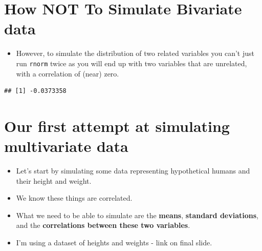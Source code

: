 \documentclass[
]{article}
\newenvironment{Shaded}{\begin{snugshade}}{\end{snugshade}}
\newcommand{\AttributeTok}[1]{\textcolor[rgb]{0.13,0.29,0.53}{#1}}
\newcommand{\CommentTok}[1]{\textcolor[rgb]{0.56,0.35,0.01}{\textit{#1}}}
\newcommand{\DecValTok}[1]{\textcolor[rgb]{0.00,0.00,0.81}{#1}}
\newcommand{\FunctionTok}[1]{\textcolor[rgb]{0.13,0.29,0.53}{\textbf{#1}}}
\newcommand{\NormalTok}[1]{#1}
\newcommand{\OtherTok}[1]{\textcolor[rgb]{0.56,0.35,0.01}{#1}}
\newcommand{\SpecialCharTok}[1]{\textcolor[rgb]{0.81,0.36,0.00}{\textbf{#1}}}
\providecommand{\tightlist}{%
  \setlength{\itemsep}{0pt}\setlength{\parskip}{0pt}}
\begin{document}
\hypertarget{how-not-to-simulate-bivariate-data}{%
\section{\texorpdfstring{How \textbf{NOT} To Simulate Bivariate
data}{How NOT To Simulate Bivariate data}}\label{how-not-to-simulate-bivariate-data}}

\begin{itemize}
\tightlist
\item
  However, to simulate the distribution of two related variables you
  can't just run \texttt{rnorm} twice as you will end up with two
  variables that are unrelated, with a correlation of (near) zero.
\end{itemize}

\begin{Shaded}
\end{Shaded}

\begin{verbatim}
## [1] -0.0373358
\end{verbatim}

\hypertarget{our-first-attempt-at-simulating-multivariate-data}{%
\section{Our first attempt at simulating multivariate
data}\label{our-first-attempt-at-simulating-multivariate-data}}

\begin{itemize}
\tightlist
\item
  Let's start by simulating some data representing hypothetical humans
  and their height and weight.
\item
  We know these things are correlated.
\item
  What we need to be able to simulate are the \textbf{means},
  \textbf{standard deviations}, and the \textbf{correlations between
  these two variables}.
\item
  I'm using a dataset of heights and weights - link on final slide.
\end{itemize}
\end{document}
